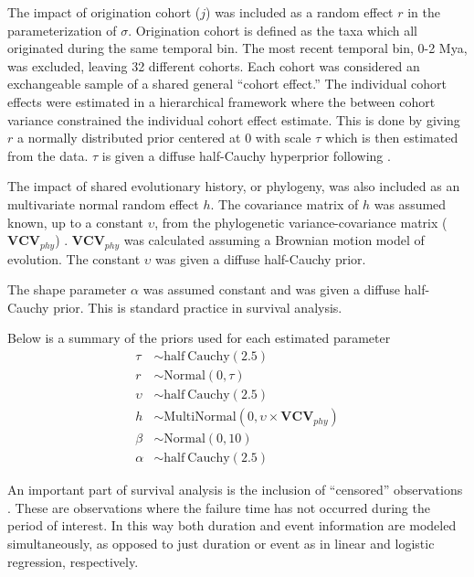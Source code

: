 \documentclass[12pt,letterpaper]{article}
\begin{document}
The impact of origination cohort (\(j\)) was included as a random effect \(r\) in the parameterization of \(\sigma\). Origination cohort is defined as the taxa which all originated during the same temporal bin. The most recent temporal bin, 0-2 Mya, was excluded, leaving 32 different cohorts. Each cohort was considered an exchangeable sample of a shared general ``cohort effect.'' The individual cohort effects were estimated in a hierarchical framework where the between cohort variance constrained the individual cohort effect estimate. This is done by giving \(r\) a normally distributed prior centered at 0 with scale \(\tau\) which is then estimated from the data. \(\tau\) is given a diffuse half-Cauchy hyperprior following \citet{Gelman2006a}.

The impact of shared evolutionary history, or phylogeny, was also included as an multivariate normal random effect \(h\). The covariance matrix of \(h\) was assumed known, up to a constant \(\upsilon\), from the phylogenetic variance-covariance matrix (\(\mathbf{VCV}_{phy}\)) \citep{Lynch1991,Housworth2004}. \(\mathbf{VCV}_{phy}\) was calculated assuming a Brownian motion model of evolution. The constant \(\upsilon\) was given a diffuse half-Cauchy prior.

The shape parameter \(\alpha\) was assumed constant and was given a diffuse half-Cauchy prior. This is standard practice in survival analysis.

Below is a summary of the priors used for each estimated parameter 
\begin{align*}
  \tau &\sim \mathrm{half\ Cauchy}(2.5) \\
  r &\sim \mathrm{Normal}(0, \tau) \\
  \upsilon &\sim \mathrm{half\ Cauchy}(2.5) \\
  h &\sim \mathrm{MultiNormal}(0, \upsilon \times \mathbf{VCV}_{phy}) \\
  \beta &\sim \mathrm{Normal}(0, 10) \\
  \alpha &\sim \mathrm{half\ Cauchy}(2.5)
\end{align*}

An important part of survival analysis is the inclusion of ``censored'' observations \citep{Ibrahim2001,Kleinbaum2005}. These are observations where the failure time has not occurred during the period of interest. In this way both duration and event information are modeled simultaneously, as opposed to just duration or event as in linear and logistic regression, respectively. 
\end{document}
